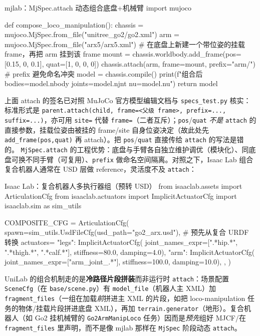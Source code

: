 \begin{codebox}[Python]{mjlab：MjSpec.attach 动态组合底盘+机械臂}
import mujoco

def compose_loco_manipulation():
    chassis = mujoco.MjSpec.from_file("unitree_go2/go2.xml")
    arm = mujoco.MjSpec.from_file("arx5/arx5.xml")
    # 在底盘上新建一个带位姿的挂载 frame，再把 arm 挂到该 frame
    mount = chassis.worldbody.add_frame(pos=[0.15, 0, 0.1], quat=[1, 0, 0, 0])
    chassis.attach(arm, frame=mount, prefix="arm/")   # prefix 避免命名冲突
    model = chassis.compile()
    print(f"组合后 bodies={model.nbody} joints={model.njnt} nu={model.nu}")
    return model
\end{codebox}

上面 attach 的签名已对照 MuJoCo 官方模型编辑文档与 \texttt{specs\_test.py} 核实：标准形式是 \texttt{parent.attach(child, frame=<父级 frame>, prefix=..., suffix=...)}，亦可用 \texttt{site=} 代替 \texttt{frame=}（二者互斥）；\texttt{pos}/\texttt{quat} \emph{不是} \texttt{attach} 的直接参数，挂载位姿由被挂的 frame/site 自身位姿决定（故此处先 \texttt{add\_frame(pos,quat)} 再 attach）。把 \texttt{pos}/\texttt{quat} 直接传给 \texttt{attach} 的写法是错的。 \texttt{MjSpec.attach} 的工程优势：底盘与手臂各自独立维护调优（模块化）、同底盘可换不同手臂（可复用）、\texttt{prefix} 做命名空间隔离。对照之下，Isaac Lab 组合复合机器人通常在 USD 层做 reference，灵活度不及 \texttt{attach}：

\begin{codebox}[Python]{Isaac Lab：复合机器人多执行器组（预转 USD）}
from isaaclab.assets import ArticulationCfg
from isaaclab.actuators import ImplicitActuatorCfg
import isaaclab.sim as sim_utils

COMPOSITE_CFG = ArticulationCfg(
    spawn=sim_utils.UsdFileCfg(usd_path="go2_arx.usd"),  # 预先从复合 URDF 转换
    actuators={
        "legs": ImplicitActuatorCfg(
            joint_names_expr=[".*hip.*", ".*thigh.*", ".*calf.*"],
            stiffness=80.0, damping=4.0),
        "arm": ImplicitActuatorCfg(
            joint_names_expr=["arm_joint_.*"], stiffness=100.0, damping=10.0),
    },
)
\end{codebox}

UniLab 的组合机制走的是\textbf{冷路径片段拼装}而非运行时 \texttt{attach}：场景配置 \texttt{SceneCfg}（在 \verb|base/scene.py|）有 \verb|model_file|（机器人主 XML）加 \verb|fragment_files|（一组在加载\emph{前}拼进主 XML 的片段，如把 loco-manipulation 任务的物体/挂载片段拼进底盘 XML），再加 \verb|terrain.generator|（地形）。复合机器人（如 Go2 挂机械臂的 \texttt{Go2ArmManipLoco} 任务）因而是\emph{预先}组好 MJCF/在 \texttt{fragment\_files} 里声明，而不是像 mjlab 那样在 \texttt{MjSpec} 阶段动态 \texttt{attach}。

